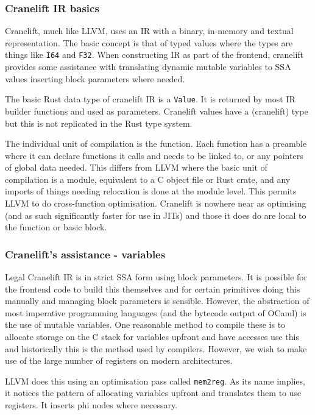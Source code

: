 \subsubsection{Cranelift IR basics}

Cranelift, much like LLVM, uses an IR with a binary, in-memory and textual representation. The
basic concept is that of typed values where the types are things like \texttt{I64} and
\texttt{F32}. When constructing IR as part of the frontend, cranelift provides some assistance with
translating dynamic mutable variables to SSA values inserting block parameters where needed.

The basic Rust data type of cranelift IR is a \texttt{Value}. It is returned by most IR builder
functions and used as parameters. Cranelift values have a (cranelift) type but this is not
replicated in the Rust type system.

The individual unit of compilation is the function. Each function has a preamble where it can
declare functions it calls and needs to be linked to, or any pointers of global data needed. This
differs from LLVM where the basic unit of compilation is a module, equivalent to a C object file or
Rust crate, and any imports of things needing relocation is done at the module level. This permits
LLVM to do cross-function optimisation. Cranelift is nowhere near as optimising (and as such
significantly faster for use in JITs) and those it does do are local to the function or basic
block.

\subsubsection{Cranelift's assistance - variables}

Legal Cranelift IR is in strict SSA form using block parameters. It is possible for the frontend
code to build this themselves and for certain primitives doing this manually and managing block
parameters is sensible. However, the abstraction of most imperative programming languages (and the
bytecode output of OCaml) is the use of mutable variables. One reasonable method to compile these
is to allocate storage on the C stack for variables upfront and have accesses use this and
historically this is the method used by compilers. However, we wish to make use of the large number
of registers on modern architectures.

LLVM does this using an optimisation pass called \texttt{mem2reg}. As its name implies, it notices
the pattern of allocating variables upfront and translates them to use registers. It inserts phi
nodes where necessary.

